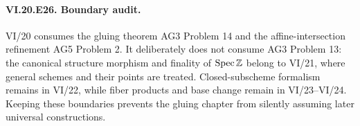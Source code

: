 \paragraph{VI.20.E26. Boundary audit.}
\begin{solution}
VI/20 consumes the gluing theorem AG3 Problem 14 and the affine-intersection refinement AG5 Problem 2.  It deliberately does not consume AG3 Problem 13: the canonical structure morphism and finality of $\operatorname{Spec}\mathbb Z$ belong to VI/21, where general schemes and their points are treated.  Closed-subscheme formalism remains in VI/22, while fiber products and base change remain in VI/23--VI/24.  Keeping these boundaries prevents the gluing chapter from silently assuming later universal constructions.
\end{solution}
